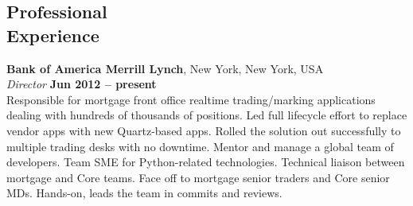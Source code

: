 \documentclass[margin,line]{resume}
\begin{document}
\begin{resume}



    \section{\mysidestyle Professional\\Experience}

    \textbf{Bank of America Merrill Lynch}, New York, New York, USA \vspace{2mm}\\\vspace{1mm}%
    \textsl{Director} \hfill \textbf{Jun 2012 -- present}\\
    Responsible for mortgage front office realtime trading/marking applications dealing with hundreds of thousands of
    positions. Led full lifecycle effort to replace vendor apps with new Quartz-based apps. Rolled the solution
    out successfully to multiple trading desks with no downtime. Mentor and manage a global team of developers. 
    Team SME for Python-related technologies. Technical liaison between mortgage and Core teams. 
    Face off to mortgage senior traders and Core senior MDs. Hands-on, leads the team in commits and reviews.


\end{resume}
\end{document}
